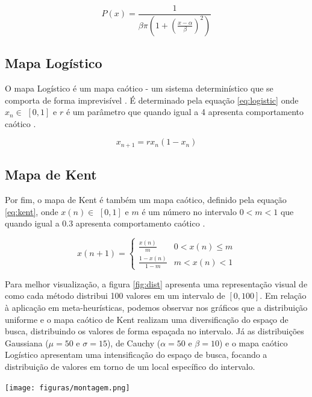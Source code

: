 \begin{equation}
P(x) = \frac{1}{\beta \pi (1 + (\frac{x - \alpha}{\beta})^2)}
\end{equation}

\subsection{Mapa Logístico}
O mapa Logístico é um mapa caótico - um sistema determinístico que se comporta de forma imprevisível \cite{fister}. É determinado pela equação \ref{eq:logistic} onde $x_{n} \in$ $[0, 1]$ e $r$ é um parâmetro que quando igual a 4 apresenta comportamento caótico \cite{fister}.

\begin{equation}
\label{eq:logistic}
x_{n + 1} = r x_{n} (1 - x_{n})
\end{equation}

\subsection{Mapa de Kent}
Por fim, o mapa de Kent é também um mapa caótico, definido pela equação \ref{eq:kent}, onde $x(n) \in$ $[0, 1]$ e $m$ é um número no intervalo $0 < m < 1$ que quando igual a 0.3 apresenta comportamento caótico \cite{fister}. 

\begin{equation}
\label{eq:kent}
x(n + 1) = 
\begin{cases}
	\frac{x(n)}{m}    & \text{$0 < x(n) \leq m$}\\
    \frac{1 - x(n)}{1 - m} & \text{$m < x(n) < 1$}
\end{cases}
\end{equation}

Para melhor visualização, a figura \ref{fig:dist} apresenta uma representação visual de como cada método distribui 100 valores em um intervalo de $[0, 100]$. Em relação à aplicação em meta-heurísticas, podemos observar nos gráficos que a distribuição uniforme e o mapa caótico de Kent realizam uma diversificação do espaço de busca, distribuindo os valores de forma espaçada no intervalo. Já as distribuições Gaussiana ($\mu = 50$ e $\sigma = 15$), de Cauchy ($\alpha = 50$ e $\beta = 10$) e o mapa caótico Logístico apresentam uma intensificação do espaço de busca, focando a distribuição de valores em torno de um local específico do intervalo.

{
    \centering
    \texttt{[image: figuras/montagem.png]}
    \label{fig:dist}
}

